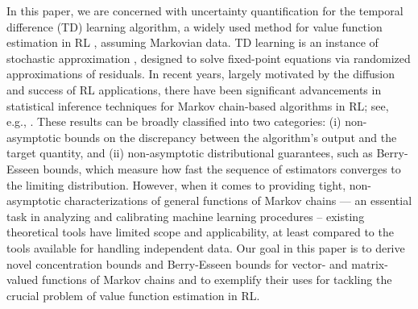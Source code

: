 In this paper, we are concerned with uncertainty quantification for the temporal difference (TD) learning algorithm, a widely used method for value function estimation in RL \citep{sutton2018reinforcement}, assuming Markovian data. TD learning is an instance of stochastic approximation \citep{robbins1951stochastic}, designed to solve fixed-point equations via randomized approximations of residuals. In recent years, largely motivated by the diffusion and success of RL applications, there have been significant advancements in statistical inference techniques for Markov chain-based algorithms in RL; see, e.g., \cite{bhandari2018finite,mou2020linear,Fan2021Hoeffding,li2021sample,samsonov2023finitesample,samsonov2024gaussian,srikant2024rates}.%
These results can be broadly classified into two categories: (i) non-asymptotic bounds on the discrepancy between the algorithm’s output and the target quantity, and (ii) non-asymptotic distributional guarantees, such as Berry-Esseen bounds, which measure how fast the sequence of estimators converges to the limiting distribution.    However, when it comes to providing tight, non-asymptotic characterizations of general functions of Markov chains — an essential task in analyzing and calibrating machine learning procedures -- existing theoretical tools have limited scope and applicability, at least compared to the tools available for handling independent data.
 Our goal in this paper is to derive novel concentration bounds and Berry-Esseen bounds for vector- and matrix-valued functions of Markov chains and to exemplify their uses for tackling the crucial problem of value function estimation in RL.






